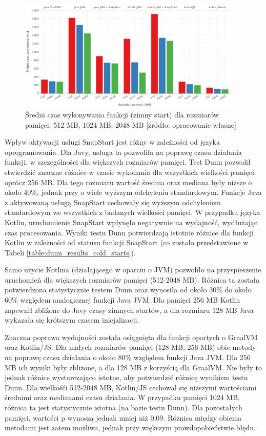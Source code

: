 \begin{figure}[!h]
    \centering
    \includegraphics[width=0.95\textwidth]{charts/results/avg-cold-start-512-2048.png}
    \caption{Średni czas wykonywania funkcji (zimny start) dla rozmiarów pamięci: 512 MB, 1024 MB, 2048 MB  [źródło: opracowanie własne]}
    \label{fig:avg_cold_start_512_2045}
\end{figure}

\newpage

Wpływ aktywacji usługi SnapStart jest różny w zależności od języka oprogramowania.
Dla Javy, usługa ta pozwoliła na poprawę czasu działania funkcji, w szczególności dla większych rozmiarów pamięci.
Test Dunn pozwolił stwierdzić znaczne różnice w czasie wykonania dla wszystkich wielkości pamięci oprócz 256 MB.
Dla tego rozmiaru wartość średnia oraz mediana były niższe o około 40\%, jednak przy o wiele wyższym odchyleniu standardowym.
Funkcje Java z aktywowaną usługą SnapStart cechowały się wyższym odchyleniem standardowym we wszystkich z badanych wielkości pamięci.
W przypadku języka Kotlin, uruchomienie SnapStart wpłynęło negatywnie na wydajność, wydłużając czas procesowania.
Wyniki testu Dunn potwierdzają istotnie różnice dla funkcji Kotlin w zależności od statusu funkcji SnapStart (co zostało przedstawione w Tabeli \ref{table:dunn_results_cold_starts}).

Samo użycie Kotlina (działającego w oparciu o JVM) pozwoliło na przyspieszenie uruchomień dla większych rozmiarów pamięci (512-2048 MB).
Różnica ta została potwierdzona statystycznie testem Dunn oraz wynosiła od około 30\% do około 60\% względem analogicznej funkcji Java JVM.
Dla pamięci 256 MB Kotlin zapewnił zbliżone do Javy czasy zimnych startów, a dla rozmiaru 128 MB Java wykazała się krótszym czasem inicjalizacji.

Znaczna poprawa wydajności została osiągnięta dla funkcji opartych o GraalVM oraz Kotlin/JS.
Dla małych rozmiarów pamięci (128 MB, 256 MB) obie metody na poprawę czasu działania o około 80\% względem funkcji Java JVM.
Dla 256 MB ich wyniki były zbliżone, a dla 128 MB z korzyścią dla GraalVM.
Nie były to jednak różnice wystarczająco istotne, aby potwierdzić różnicę wynikiem testu Dunn.
Dla wielkośći 512-2048 MB, Kotlin/JS cechował się niższymi wartościami średnimi oraz medianami czasu działania.
W przypadku pamięci 1024 MB, różnica ta jest statystycznie istotna (na bazie testu Dunn).
Dla pozostałych pamięci, wartości p wynoszą jednak mniej niż 0,09. 
Różnica między obiema metodami jest zatem możliwa, jednak przy większym prawdopobieństwie błędu.

